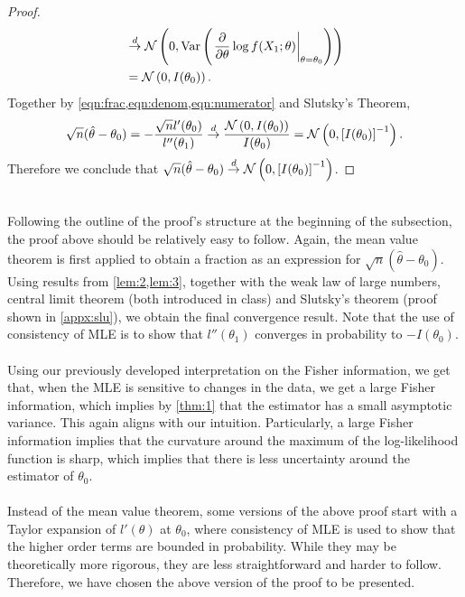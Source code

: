 \begin{proof}
\begin{align}
&\overset{d}{\rightarrow} \mathcal{N}\left(0, \text{Var}\left( \left.\frac{\partial}{\partial\theta}\log f(X_1;\theta)\right\vert_{\theta=\theta_0} \right)\right)\nonumber\\
&= \mathcal{N}\left( 0, I(\theta_0) \right). \label{eqn:numerator}
\end{align}
Together by \cref{eqn:frac,eqn:denom,eqn:numerator} and Slutsky's Theorem,
\begin{align*}
\sqrt{n}(\hat{\theta} - \theta_0) = -\frac{\sqrt{n}l'(\theta_0)}{l''(\theta_1)} \overset{d}{\rightarrow} \frac{\mathcal{N}\left(0,I(\theta_0)\right)}{I(\theta_0)} = \mathcal{N}\left(0, \left[ I(\theta_0) \right]^{-1}\right).
\end{align*}
Therefore we conclude that $\sqrt{n}(\hat{\theta} - \theta_0)\overset{d}{\rightarrow}\mathcal{N}\left(0, \left[ I(\theta_0) \right]^{-1}\right)$.
\end{proof}$ $\\
Following the outline of the proof's structure at the beginning of the subsection, the proof above should be relatively easy to follow. Again, the mean value theorem is first applied to obtain a fraction as an expression for $\sqrt{n}(\hat{\theta} - \theta_0)$. Using results from \cref{lem:2,lem:3}, together with the weak law of large numbers, central limit theorem (both introduced in class) and Slutsky's theorem (proof shown in \cref{appx:slu}), we obtain the final convergence result. Note that the use of consistency of MLE is to show that $l''(\theta_1)$ converges in probability to $-I(\theta_0)$.\\\\
Using our previously developed interpretation on the Fisher information, we get that, when the MLE is sensitive to changes in the data, we get a large Fisher information, which implies by \cref{thm:1} that the estimator has a small asymptotic variance. This again aligns with our intuition. Particularly, a large Fisher information implies that the curvature around the maximum of the log-likelihood function is sharp, which implies that there is less uncertainty around the estimator of $\theta_0$.\\\\
Instead of the mean value theorem, some versions of the above proof start with a Taylor expansion of $l'(\theta)$ at $\theta_0$, where consistency of MLE is used to show that the higher order terms are bounded in probability. While they may be theoretically more rigorous, they are less straightforward and harder to follow. Therefore, we have chosen the above version of the proof to be presented.\\\\
